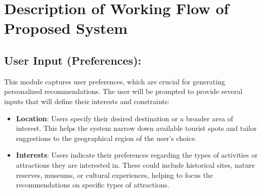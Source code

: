 \section{Description of Working Flow of Proposed System}

\subsection{User Input (Preferences):}
This module captures user preferences, which are crucial for generating personalized recommendations. The user will be prompted to provide several inputs that will define their interests and constraints:
\begin{itemize}
    \item \textbf{Location}: Users specify their desired destination or a broader area of interest. This helps the system narrow down available tourist spots and tailor suggestions to the geographical region of the user’s choice.
    \item \textbf{Interests}: Users indicate their preferences regarding the types of activities or attractions they are interested in. These could include historical sites, nature reserves, museums, or cultural experiences, helping to focus the recommendations on specific types of attractions.
\end{itemize}

